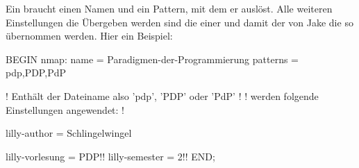 Ein  braucht einen Namen und ein Pattern, mit dem er auslöst. Alle weiteren Einstellungen die Übergeben werden sind die einer  und damit der  von Jake die so übernommen werden. Hier ein Beispiel:
\begin{gepard}
BEGIN nmap:
    name            = Paradigmen-der-Programmierung
    patterns        = pdp,PDP,PdP

    ! Enthält der Dateiname also 'pdp', 'PDP' oder 'PdP' !
    ! werden folgende Einstellungen angewendet:          !

    lilly-author    = Schlingelwingel

    lilly-vorlesung = PDP!!
    lilly-semester  = 2!!
END;
\end{gepard}